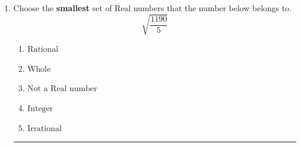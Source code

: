 \documentclass[14pt]{extbook}
\newcommand{\litem}[1]{\item#1\hspace*{-1cm}\rule{\textwidth}{0.4pt}}
\begin{document}
\begin{enumerate}
{\begin{enumerate}[label=\Alph*.]
\end{enumerate} }
\litem{
Choose the \textbf{smallest} set of Real numbers that the number below belongs to.\[ \sqrt{\frac{1190}{5}} \]\begin{enumerate}[label=\Alph*.]
\item \( \text{Rational} \)
\item \( \text{Whole} \)
\item \( \text{Not a Real number} \)
\item \( \text{Integer} \)
\item \( \text{Irrational} \)

\end{enumerate} }
\end{enumerate}
\end{document}
